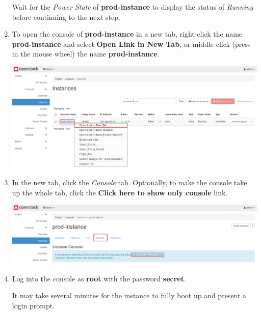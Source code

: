 \documentclass[letterpaper, 12pt]{article}
\begin{document}
\begin{enumerate}
    \begin{stopbox}
        Wait for the \textit{Power State} of \textbf{prod-instance} to display the status of \textit{Running} before continuing to the next step.
    \end{stopbox}

    \item To open the console of \textbf{prod-instance} in a new tab, right-click the name \textbf{prod-instance} and select \textbf{Open Link in New Tab}, or middle-click (press in the mouse wheel) the name \textbf{prod-instance}.

    \begin{center}
        \includegraphics[width=\linewidth]{images/part1/step11.png}
    \end{center}

    \item In the new tab, click the \textit{Console} tab. Optionally, to make the console take up the whole tab, click the \textbf{Click here to show only console} link.

    \begin{center}
        \includegraphics[width=\linewidth]{images/part1/step12.png}
    \end{center}

    \item Log into the console as \textbf{root} with the password \textbf{secret}.

    \begin{notebox}
        It may take several minutes for the instance to fully boot up and present a login prompt.
    \end{notebox}


\end{enumerate}
\end{document}
